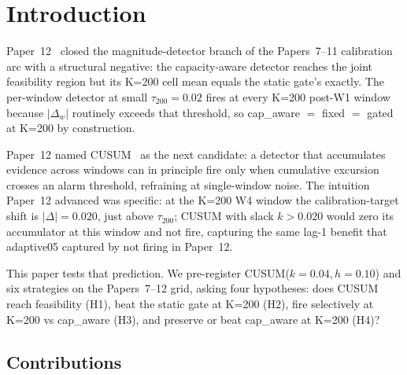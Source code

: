 \section{Introduction}

Paper~12~\cite{paper12capaware} closed the magnitude-detector branch
of the Papers~7--11 calibration arc with a structural negative: the
capacity-aware detector reaches the joint feasibility region but its
K=200 cell mean equals the static gate's exactly. The per-window
detector at small $\tau_{200} = 0.02$ fires at every K=200 post-W1
window because $|\Delta_w|$ routinely exceeds that threshold, so
cap\_aware $=$ fixed $=$ gated at K=200 by construction.

Paper~12 named CUSUM~\cite{page1954cusum} as the next candidate: a
detector that accumulates evidence across windows can in principle
fire only when cumulative excursion crosses an alarm threshold,
refraining at single-window noise. The intuition Paper~12 advanced
was specific: at the K=200 W4 window the calibration-target shift
is $|\Delta| = 0.020$, just above $\tau_{200}$; CUSUM with slack
$k > 0.020$ would zero its accumulator at this window and not fire,
capturing the same lag-1 benefit that adaptive05 captured by not
firing in Paper~12.

This paper tests that prediction. We pre-register CUSUM($k = 0.04,
h = 0.10$) and six strategies on the Papers~7--12 grid, asking four
hypotheses: does CUSUM reach feasibility (H1), beat the static gate
at K=200 (H2), fire selectively at K=200 vs cap\_aware (H3), and
preserve or beat cap\_aware at K=200 (H4)?

\subsection{Contributions}

